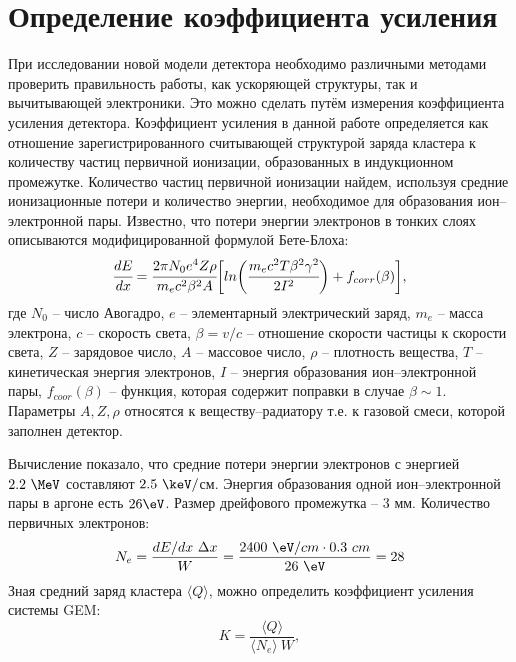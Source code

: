 \section{Определение коэффициента усиления}
\label{sec:ampl_c}
При исследовании новой модели детектора необходимо различными методами проверить правильность работы, как ускоряющей структуры, так и вычитывающей электроники. Это можно сделать путём измерения коэффициента усиления детектора. 
Коэффициент усиления в данной работе определяется как отношение зарегистрированного считывающей структурой заряда кластера к количеству частиц первичной ионизации, образованных в индукционном промежутке. 
Количество частиц первичной ионизации найдем, используя средние ионизационные потери и количество энергии, необходимое для образования ион--электронной пары. Известно, что потери энергии электронов в тонких слоях описываются модифицированной формулой Бете-Блоха:
\begin{equation}
\cfrac{dE}{dx} = \cfrac{2\pi N_0 e^4 Z\rho}{m_e c^2 \beta^2 A}\biggl[ln \bigg(\cfrac{ m_ec^2T\beta^2\gamma^2}{2I^2}\bigg) + f_{corr}(\beta)\biggr],
\label{eq:Bethe_Bloch}
\end{equation}
где $N_0$ -- число Авогадро, $e$ -- элементарный электрический заряд, $m_e$ -- масса электрона, $c$ -- скорость света, $\beta = v/c$ -- отношение скорости частицы к скорости света, $Z$ -- зарядовое число, $A$ -- массовое число, $\rho$ -- плотность вещества, $T$ -- кинетическая энергия электронов, $I$ -- энергия образования ион--электронной пары, $f_{coor}(\beta)$ -- функция, которая содержит поправки в случае $\beta \sim 1$. Параметры $A,Z,\rho$ относятся к веществу--радиатору т.е. к газовой смеси, которой заполнен детектор.
\par Вычисление показало, что средние потери энергии электронов с энергией $2.2~\MeV$ составляют $2.5~\keV/$см. Энергия образования одной ион--электронной пары в аргоне есть $26\eV$. Размер дрейфового промежутка -- 3 мм. Количество первичных электронов:
\begin{equation}
	N_e = \frac{dE/dx~\Delta x}{W} =\frac {2400~\eV/cm \cdot 0.3~cm}{26~\eV} = 28
\end{equation}
Зная средний заряд кластера $\langle Q\rangle$, можно определить коэффициент усиления системы GEM: 
\begin{equation}
K = \frac{\langle Q\rangle}{\langle N_e \rangle\ W},
\label{eq:ampl_k}
\end{equation}
